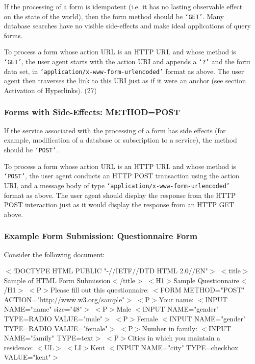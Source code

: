 If the processing of a form is idempotent (i.e.  it has no lasting
observable effect on the state of the world), then the form method
should be {\tt `GET'}.  Many database searches have no visible
side-effects and make ideal applications of query forms.
\par \par 
To process a form whose action URL is an HTTP URL and whose method
is {\tt `GET'}, the user agent starts with the action URI and appends a
{\tt `?'} and the form data set, in
{\tt `application/x-www-form-urlencoded'} format as above.  The user
agent then traverses the link to this URI just as if it were an anchor
(see section Activation of Hyperlinks).
(27)\par \subsubsection*{Forms with Side-Effects:  METHOD=POST}\par 
If the service associated with the processing of a form has side
effects (for example, modification of a database or subscription to a
service), the method should be {\tt `POST'}.
\par \par 
To process a form whose action URL is an HTTP URL and whose method
is {\tt `POST'}, the user agent conducts an HTTP POST transaction using
the action URI, and a message body of type
{\tt `application/x-www-form-urlencoded'} format as above.  The user
agent should display the response from the HTTP POST interaction just
as it would display the response from an HTTP GET above.
\par \subsubsection*{Example Form Submission:  Questionnaire Form}\par 
Consider the following document:
\par $<$!DOCTYPE HTML PUBLIC "-//IETF//DTD HTML 2.0//EN"$>$
$<$title$>$Sample of HTML Form Submission$<$/title$>$
$<$H1$>$Sample Questionnaire$<$/H1$>$
$<$P$>$Please fill out this questionnaire:
$<$FORM METHOD="POST" ACTION="http://www.w3.org/sample"$>$
$<$P$>$Your name: $<$INPUT NAME="name" size="48"$>$
$<$P$>$Male $<$INPUT NAME="gender" TYPE=RADIO VALUE="male"$>$
$<$P$>$Female $<$INPUT NAME="gender" TYPE=RADIO VALUE="female"$>$
$<$P$>$Number in family: $<$INPUT NAME="family" TYPE=text$>$
$<$P$>$Cities in which you maintain a residence:
$<$UL$>$
$<$LI$>$Kent $<$INPUT NAME="city" TYPE=checkbox VALUE="kent"$>$
